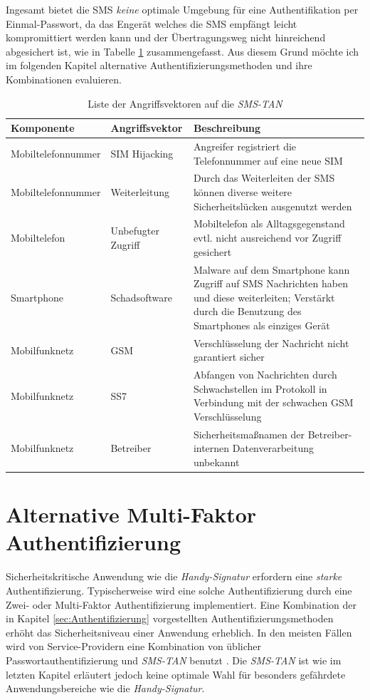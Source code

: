 \documentclass[11pt,a4paper,ngerman]{scrreprt}
\begin{document}
Ingesamt bietet die SMS \emph{keine} optimale Umgebung für eine Authentifikation per Einmal-Passwort, da das Engerät welches die SMS empfängt leicht kompromittiert werden kann und der Übertragungsweg nicht hinreichend abgesichert ist, wie in Tabelle \ref{table:AngriffsvektorenSMSTAN} zusammengefasst. Aus diesem Grund möchte ich im folgenden Kapitel alternative Authentifizierungsmethoden und ihre Kombinationen evaluieren.
\begin{table}[htbp]
    \begin{tabularx}{\textwidth}{ llX }
        \toprule
        Komponente & Angriffsvektor & Beschreibung  \\
        \midrule
        Mobiltelefonnummer & SIM Hijacking & Angreifer registriert die Telefonnummer auf eine neue SIM \\
        Mobiltelefonnummer & Weiterleitung & Durch das Weiterleiten der SMS können diverse weitere Sicherheitslücken ausgenutzt werden \\
        Mobiltelefon & Unbefugter Zugriff & Mobiltelefon als Alltagsgegenstand evtl. nicht ausreichend vor Zugriff gesichert \\
        Smartphone & Schadsoftware & Malware auf dem Smartphone kann Zugriff auf SMS Nachrichten haben und diese weiterleiten; Verstärkt durch die Benutzung des Smartphones als einziges Gerät \\
        Mobilfunknetz & GSM & Verschlüsselung der Nachricht nicht garantiert sicher \\
        Mobilfunknetz & SS7 & Abfangen von Nachrichten durch Schwachstellen im Protokoll in Verbindung mit der schwachen GSM Verschlüsselung \\
        Mobilfunknetz & Betreiber & Sicherheitsmaßnamen der Betreiber-internen Datenverarbeitung unbekannt \\
    \end{tabularx}
    \caption{Liste der Angriffsvektoren auf die \textit{SMS-TAN}}
    \label{table:AngriffsvektorenSMSTAN}
\end{table}

\chapter{Alternative Multi-Faktor Authentifizierung}
Sicherheitskritische Anwendung wie die \textit{Handy-Signatur} erfordern eine \emph{starke} Authentifizierung. Typischerweise wird eine solche Authentifizierung durch eine Zwei- oder Multi-Faktor Authentifizierung implementiert. Eine Kombination der in Kapitel \ref{sec:Authentifizierung} vorgestellten Authentifizierungsmethoden erhöht das Sicherheitsniveau einer Anwendung erheblich. In den meisten Fällen wird von Service-Providern eine Kombination von üblicher Passwortauthentifizierung und \textit{SMS-TAN} benutzt \cite{fido17}. Die \textit{SMS-TAN} ist wie im letzten Kapitel erläutert jedoch keine optimale Wahl für besonders gefährdete Anwendungsbereiche wie die \textit{Handy-Signatur}.
\end{document}
